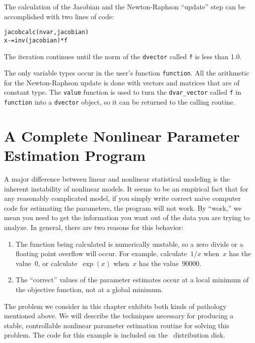 \documentclass{admbmanual}
\begin{document}
The calculation of the Jacobian and the Newton-Raphson ``update'' step 
can be accomplished with two lines of code:
\begin{lstlisting}
jacobcalc(nvar,jacobian)
x-=inv(jacobian)*f
\end{lstlisting}
The iteration continues until the norm of the \texttt{dvector} called \texttt{f}
is less than 1.0.

The only variable types occur in the
user's function \texttt{function}. All the arithmetic for the
Newton-Raphson update is done with vectors and matrices that
are of constant type.  The \texttt{value} function is used to
turn the \texttt{dvar\_vector} called \texttt{f} in \texttt{function} into
a \texttt{dvector} object, so it can be returned to the
calling routine. 



\chapter{A Complete Nonlinear Parameter Estimation Program}
\label{nonlinear-estimation}

A major difference between linear and nonlinear statistical
modeling is the inherent instability of nonlinear models.
It seems to be an empirical fact that for any
reasonably complicated model, if you simply write correct
naive computer code for estimating the parameters, the
program will not work. By ``work,'' we mean you need to get the information
you want out of the data you are trying to analyze. 
In general, there are two reasons for this behavior:
\begin{enumerate}
\item The function being calculated is numerically unstable, so
a zero divide or a floating point overflow
 will occur.   For example, calculate~$1/x$ 
when~$x$ has the value~$0$, or calculate~$\exp(x)$ when~$x$ 
has the value~$90000$.

\item The ``correct'' values of the parameter estimates occur at a local
minimum of the objective function, not at a global minimum.
\end{enumerate}

The problem we consider in this chapter exhibits both kinds of pathology
mentioned above.  We will describe the techniques necessary for
producing a stable, controllable nonlinear parameter estimation
routine for solving this problem. The code for this example is 
included on the \scAD\ distribution disk.
\end{document}
